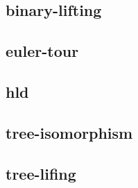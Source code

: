\documentclass[a4paper, twocolumn]{article}
\begin{document}
\subsection{binary-lifting}

\subsection{euler-tour}

\subsection{hld}

\subsection{tree-isomorphism}

\subsection{tree-lifing}

\end{document}
